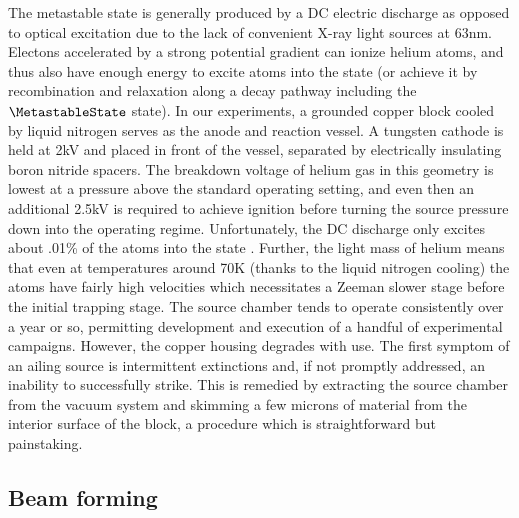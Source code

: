 	The metastable \mhe state is generally produced by a DC electric discharge as opposed to optical excitation due to the lack of convenient X-ray light sources at 63nm.
	Electons accelerated by a strong potential gradient can ionize helium atoms, and thus also have enough energy to excite atoms into the \mhe state (or achieve it by recombination and relaxation along a decay pathway including the $\MetastableState$ state).
	In our experiments, a grounded copper block cooled by liquid nitrogen serves as the anode and reaction vessel.
	A tungsten cathode is held at 2kV and placed in front of the vessel, separated by electrically insulating boron nitride spacers.
	The breakdown voltage of helium gas in this geometry is lowest at a pressure above the standard operating setting, and even then an additional 2.5kV is required to achieve ignition before turning the source pressure down into the operating regime.
	Unfortunately, the DC discharge only excites about .01\% of the atoms into the \mhe state \cite{Stas06}.
	Further, the light mass of helium means that even at temperatures around 70K (thanks to the liquid nitrogen cooling) the atoms have fairly high velocities which necessitates a Zeeman slower stage before the initial trapping stage. 
	The source chamber tends to operate consistently over a year or so, permitting development and execution of a handful of experimental campaigns.
	However, the copper housing degrades with use.
	The first symptom of an ailing source is intermittent extinctions and, if not promptly addressed, an inability to successfully strike.
	This is remedied by extracting the source chamber from the vacuum system and skimming a few microns of material from the interior surface of the block, a procedure which is  straightforward but painstaking.
	

\subsection*{Beam forming}

